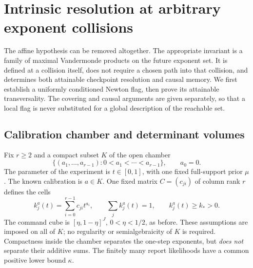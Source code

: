 \documentclass[11pt]{amsart}
\theoremstyle{definition}\newtheorem{definition}[theorem]{Definition}
\theoremstyle{remark}\newtheorem{remark}[theorem]{Remark}
\begin{document}
\section{Intrinsic resolution at arbitrary exponent collisions}\label{sec:collision-geometry}
The affine hypothesis can be removed altogether. The appropriate invariant
is a family of maximal Vandermonde products on the future exponent set.
It is defined at a collision itself, does not require a chosen path into
that collision, and determines both attainable checkpoint resolution and
causal memory. We first establish a uniformly conditioned Newton flag,
then prove its attainable transversality. The covering and causal arguments
are given separately, so that a local flag is never substituted for a
global description of the reachable set.

\subsection{Calibration chamber and determinant volumes}
Fix $r\ge2$ and a compact subset $K$ of the open chamber
\[
 \{(a_1,\ldots,a_{r-1}):0<a_1<\cdots<a_{r-1}\},
 \qquad a_0=0.
\]
The parameter of the experiment is $t\in[0,1]$, with one fixed
full-support prior $\mu$. The known calibration is $a\in K$.
One fixed matrix $C=(c_{ji})$ of column rank $r$ defines the cells
\[
 k_j^a(t)=\sum_{i=0}^{r-1}c_{ji}t^{a_i},\qquad
 \sum_jk_j^a(t)=1,\qquad k_j^a(t)\ge k_*>0.
\]
The command cube is $[\eta,1-\eta]^J$, $0<\eta<1/2$, as before.
These assumptions are imposed on all of $K$; no regularity or
semialgebraicity of $K$ is required. Compactness inside the chamber
separates the one-step exponents, but \emph{does not} separate their
additive sums. The finitely many report likelihoods have a common
positive lower bound $\kappa$.
\end{document}
